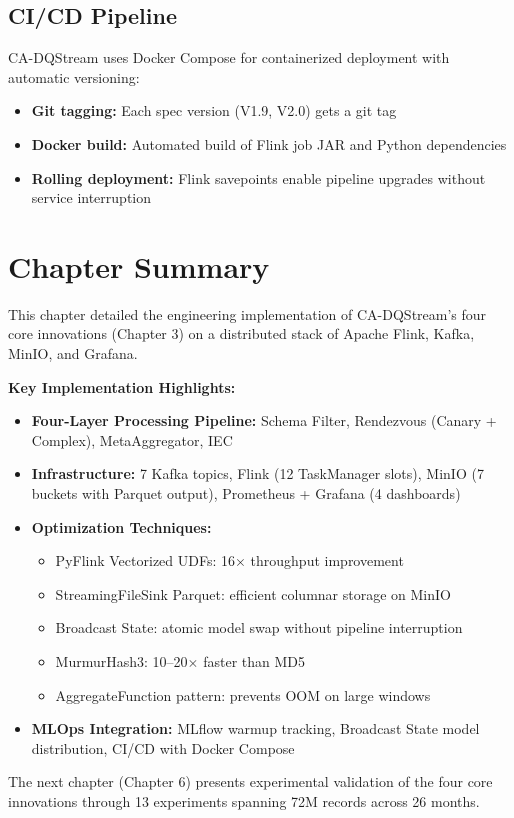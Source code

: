 \subsection{CI/CD Pipeline}

CA-DQStream uses Docker Compose for containerized deployment with automatic versioning:

\begin{itemize}
    \item \textbf{Git tagging:} Each spec version (V1.9, V2.0) gets a git tag
    \item \textbf{Docker build:} Automated build of Flink job JAR and Python dependencies
    \item \textbf{Rolling deployment:} Flink savepoints enable pipeline upgrades without service interruption
\end{itemize}

\section{Chapter Summary}

This chapter detailed the engineering implementation of CA-DQStream's four core innovations (Chapter 3) on a distributed stack of Apache Flink, Kafka, MinIO, and Grafana.

\textbf{Key Implementation Highlights:}

\begin{itemize}
    \item \textbf{Four-Layer Processing Pipeline:} Schema Filter, Rendezvous (Canary + Complex), MetaAggregator, IEC
    \item \textbf{Infrastructure:} 7 Kafka topics, Flink (12 TaskManager slots), MinIO (7 buckets with Parquet output), Prometheus + Grafana (4 dashboards)
    \item \textbf{Optimization Techniques:}
        \begin{itemize}
            \item PyFlink Vectorized UDFs: 16$\times$ throughput improvement
            \item StreamingFileSink Parquet: efficient columnar storage on MinIO
            \item Broadcast State: atomic model swap without pipeline interruption
            \item MurmurHash3: 10--20$\times$ faster than MD5
            \item AggregateFunction pattern: prevents OOM on large windows
        \end{itemize}
    \item \textbf{MLOps Integration:} MLflow warmup tracking, Broadcast State model distribution, CI/CD with Docker Compose
\end{itemize}

The next chapter (Chapter 6) presents experimental validation of the four core innovations through 13 experiments spanning 72M records across 26 months.
